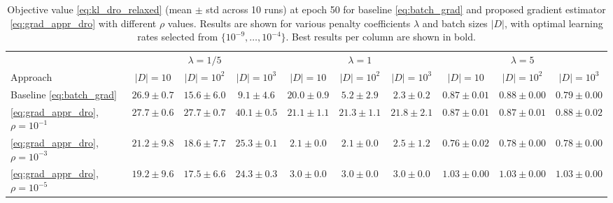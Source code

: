 \documentclass{article}
\theoremstyle{plain}
\theoremstyle{definition}
\theoremstyle{remark}
\begin{document}
\begin{table}[t]
\centering
\small
\setlength{\tabcolsep}{3pt}
\caption{ {Objective value \eqref{eq:kl_dro_relaxed} (mean $\pm$ std across 10 runs) at epoch 50 for baseline \eqref{eq:batch_grad} \citep{levy2020large} and proposed gradient estimator \eqref{eq:grad_appr_dro} with different $\rho$ values. Results are shown for various penalty coefficients $\lambda$ and batch sizes $|D|$, with optimal learning rates selected from $\{10^{-9}, \dots, 10^{-4}\}$. Best results per column are shown in bold.}}
\label{tab:results}
\begin{tabular}{l|ccc|ccc|ccc}
\toprule
  & \multicolumn{3}{c|}{$\lambda=1/5$} & \multicolumn{3}{c|}{$\lambda=1$} & \multicolumn{3}{c}{$\lambda=5$} \\
\cline{2-4} \cline{5-7} \cline{8-10}
Approach & $|D|\!=\!10$ & $|D|\!=\!10^{2}$ & $|D|\!=\!10^{3}$ & $|D|\!=\!10$ & $|D|\!=\!10^{2}$ & $|D|\!=\!10^{3}$ & $|D|\!=\!10$ & $|D|\!=\!10^{2}$ & $|D|\!=\!10^{3}$ \\
\midrule
Baseline \eqref{eq:batch_grad} & $26.9\!\pm\!0.7$ & $15.6\!\pm\!6.0$ & $\bm{9.1\!\pm\!4.6}$ & $20.0\!\pm\!0.9$ & $5.2\!\pm\!2.9$ & $\bm{2.3\!\pm\!0.2}$ & $0.87\!\pm\!0.01$ & $0.88\!\pm\!0.00$ & $0.79\!\pm\!0.00$ \\
\hline
\eqref{eq:grad_appr_dro}, $\rho\!=\!10^{-1}$ & $27.7\!\pm\!0.6$ & $27.7\!\pm\!0.7$ & $40.1\!\pm\!0.5$ & $21.1\!\pm\!1.1$ & $21.3\!\pm\!1.1$ & $21.8\!\pm\!2.1$ & $0.87\!\pm\!0.01$ & $0.87\!\pm\!0.01$ & $0.88\!\pm\!0.02$ \\
\hline
\eqref{eq:grad_appr_dro}, $\rho\!=\!10^{-3}$ & $21.2\!\pm\!9.8$ & $18.6\!\pm\!7.7$ & $25.3\!\pm\!0.1$ & $\bm{2.1\!\pm\!0.0}$ & $\bm{2.1\!\pm\!0.0}$ & $\bm{2.5\!\pm\!1.2}$ & $\bm{0.76\!\pm\!0.02}$ & $\bm{0.78\!\pm\!0.00}$ & $\bm{0.78\!\pm\!0.00}$ \\
\hline
\eqref{eq:grad_appr_dro}, $\rho\!=\!10^{-5}$ & $19.2\!\pm\!9.6$ & $17.5\!\pm\!6.6$ & $24.3\!\pm\!0.3$ & $3.0\!\pm\!0.0$ & $3.0\!\pm\!0.0$ & $3.0\!\pm\!0.0$ & $1.03\!\pm\!0.00$ & $1.03\!\pm\!0.00$ & $1.03\!\pm\!0.00$ \\
\bottomrule
\end{tabular}
\end{table}
\end{document}
